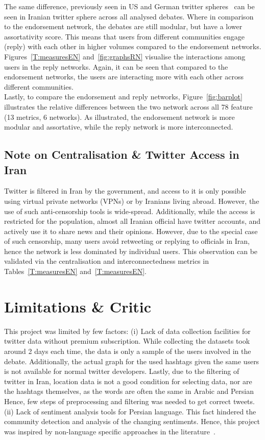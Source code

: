 \documentclass[journal,11pt]{IEEEtran}
\begin{document}
The same difference, previously seen in US and German twitter spheres~\cite{gillani2018me,barbera2014social} can be seen in Iranian twitter sphere across all analysed debates. Where in comparison to the endorsement network, the debates are still modular, but have a lower assortativity score. This means that users from different communities engage (reply) with each other in higher volumes compared to the endorsement networks. Figures~\ref{T:measuresEN} and~\ref{fig:graphsRN} visualise the interactions among users in the reply networks. Again, it can be seen that compared to the endorsement networks, the users are interacting more with each other across different communities. \\

Lastly, to compare the endorsement and reply networks, Figure~\ref{fig:barplot} illustrates the relative differences between the two network across all 78 feature (13 metrics, 6 networks). As illustrated, the endorsement network is more modular and assortative, while the reply network is more interconnected. 
\subsection{Note on Centralisation \& Twitter Access in Iran}
Twitter is filtered in Iran by the government, and access to it is only possible using virtual private networks (VPNs) or by Iranians living abroad. However, the use of such anti-censorship tools is wide-spread. Additionally, while the access is restricted for the population, almost all Iranian official have twitter accounts, and actively use it to share news and their opinions. However, due to the special case of such censorship, many users avoid retweeting or replying to officials in Iran, hence the network is less dominated by individual users. This observation can be validated via the centralisation and interconnectedness metrics in Tables~\ref{T:measuresEN} and~\ref{T:measuresEN}.
\section{Limitations \& Critic}
\label{S:Conc}
This project was limited by few factors: (i) Lack of data collection facilities for twitter data without premium subscription. While collecting the datasets took around 2 days each time, the data is only a sample of the users involved in the debate. Additionally, the actual graph for the used hashtags given the same users is not available for normal twitter developers. Lastly, due to the filtering of twitter in Iran, location data is not a good condition for selecting data, nor are the hashtags themselves, as the words are often the same in Arabic and Persian Hence, few steps of preprocessing and filtering was needed to get correct tweets. (ii) Lack of sentiment analysis tools for Persian language. This fact hindered the community detection and analysis of the changing sentiments. Hence, this project was inspired by non-language specific approaches in the literature~\cite{chkhartishvili2018binary,garimella2017reducing}. \\
\end{document}
